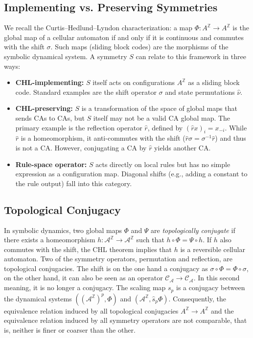 \documentclass[a4paper]{article}
\begin{document}
\subsection{Implementing vs. Preserving Symmetries}
We recall the Curtis--Hedlund--Lyndon characterization: a map $\Phi : A^{\mathbb{Z}} \to A^{\mathbb{Z}}$ is the global map of a cellular automaton if and only if it is continuous and commutes with the shift $\sigma$. Such maps (sliding block codes) are the morphisms of the symbolic dynamical system. A symmetry $S$ can relate to this framework in three ways:
\begin{itemize}
  \item \textbf{CHL-implementing:} $S$ itself acts on configurations $A^{\mathbb{Z}}$ as a sliding block code. Standard examples are the shift operator $\sigma$ and state permutations $\hat{\nu}$.
  \item \textbf{CHL-preserving:} $S$ is a transformation of the space of global maps that sends CAs to CAs, but $S$ itself may not be a valid CA global map. The primary example is the reflection operator $\hat{r}$, defined by $(\hat{r}x)_i = x_{-i}$. While $\hat{r}$ is a homeomorphism, it anti-commutes with the shift ($\hat{r}\sigma = \sigma^{-1}\hat{r}$) and thus is not a CA. However, conjugating a CA by $\hat{r}$ yields another CA.
  \item \textbf{Rule-space operator:} $S$ acts directly on local rules but has no simple expression as a configuration map. Diagonal shifts (e.g., adding a constant to the rule output) fall into this category.
\end{itemize}

\subsection{Topological Conjugacy}
In symbolic dynamics, two global maps $\Phi$ and $\Psi$ are \emph{topologically conjugate} if there exists a homeomorphism $h: \mathcal{A}^{\mathbb{Z}} \to \mathcal{A}^{\mathbb{Z}}$ such that $h \circ \Phi = \Psi \circ h$. If $h$ also commutes with the shift, the CHL theorem implies that $h$ is a reversible cellular automaton.
Two of the symmetry operators, permutation and reflection, are topological conjugacies.
The shift is on the one hand a conjugacy as $\sigma \circ \Phi = \Phi \circ \sigma$,
on the other hand, it can also be seen as an operator $\mathcal{C}_\mathcal{A} \to \mathcal{C}_\mathcal{A}$.
In this second meaning, it is no longer a conjugacy.
The scaling map $s_p$ is a conjugacy between the dynamical systems
 $((\mathcal{A}^\mathbb{Z})^p, \Phi)$ and $(\mathcal{A}^\mathbb{Z}, \hat{s}_p \Phi)$.
Consequently,
the equivalence relation induced by all topological conjugacies $A^\mathbb{Z} \to A^\mathbb{Z}$
and the equivalence relation induced by all symmetry operators are not comparable, that is,
neither is finer or coarser than the other.
\end{document}
